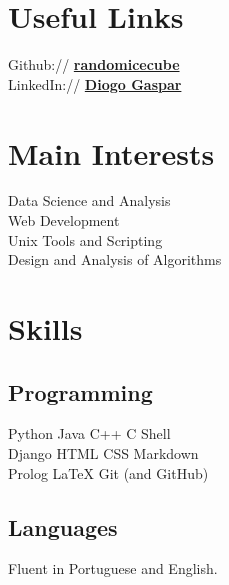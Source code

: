 \documentclass[]{deedy-resume-openfont}
\begin{document}
%
%
\lastupdated

%
%

%
%

\begin{minipage}[t]{0.33\textwidth}


\section{Useful Links} 
Github:// \href{https://github.com/randomicecube}{\bf randomicecube} \\
LinkedIn://  \href{https://www.linkedin.com/in/diogo-gaspar-74142821b/}{\bf Diogo Gaspar}


\section{Main Interests}
Data Science and Analysis \\
Web Development\\
Unix Tools and Scripting \\
Design and Analysis of Algorithms


\section{Skills}
\subsection{Programming}
Python \textbullet{} Java \textbullet{} C++ \textbullet{} C \textbullet{} Shell\\
Django \textbullet{} HTML \textbullet{} CSS \textbullet{} Markdown \\
Prolog \textbullet{} \LaTeX \textbullet{} Git (and GitHub)
\sectionsep


\sectionsep

\subsection{Languages}
Fluent in Portuguese and English.
\sectionsep

%
%

\end{minipage} 
\end{document}
